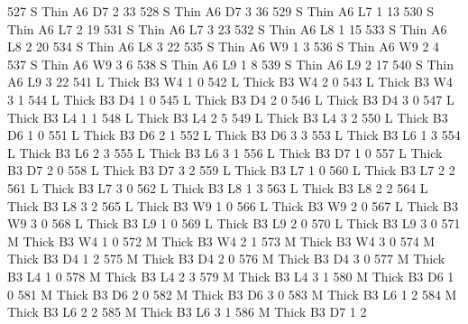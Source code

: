 \documentclass{article}
\begin{document}
\begin{Schunk}
\begin{Soutput}
527       S   Thin   A6      D7     2    33
528       S   Thin   A6      D7     3    36
529       S   Thin   A6      L7     1    13
530       S   Thin   A6      L7     2    19
531       S   Thin   A6      L7     3    23
532       S   Thin   A6      L8     1    15
533       S   Thin   A6      L8     2    20
534       S   Thin   A6      L8     3    22
535       S   Thin   A6      W9     1     3
536       S   Thin   A6      W9     2     4
537       S   Thin   A6      W9     3     6
538       S   Thin   A6      L9     1     8
539       S   Thin   A6      L9     2    17
540       S   Thin   A6      L9     3    22
541       L  Thick   B3      W4     1     0
542       L  Thick   B3      W4     2     0
543       L  Thick   B3      W4     3     1
544       L  Thick   B3      D4     1     0
545       L  Thick   B3      D4     2     0
546       L  Thick   B3      D4     3     0
547       L  Thick   B3      L4     1     1
548       L  Thick   B3      L4     2     5
549       L  Thick   B3      L4     3     2
550       L  Thick   B3      D6     1     0
551       L  Thick   B3      D6     2     1
552       L  Thick   B3      D6     3     3
553       L  Thick   B3      L6     1     3
554       L  Thick   B3      L6     2     3
555       L  Thick   B3      L6     3     1
556       L  Thick   B3      D7     1     0
557       L  Thick   B3      D7     2     0
558       L  Thick   B3      D7     3     2
559       L  Thick   B3      L7     1     0
560       L  Thick   B3      L7     2     2
561       L  Thick   B3      L7     3     0
562       L  Thick   B3      L8     1     3
563       L  Thick   B3      L8     2     2
564       L  Thick   B3      L8     3     2
565       L  Thick   B3      W9     1     0
566       L  Thick   B3      W9     2     0
567       L  Thick   B3      W9     3     0
568       L  Thick   B3      L9     1     0
569       L  Thick   B3      L9     2     0
570       L  Thick   B3      L9     3     0
571       M  Thick   B3      W4     1     0
572       M  Thick   B3      W4     2     1
573       M  Thick   B3      W4     3     0
574       M  Thick   B3      D4     1     2
575       M  Thick   B3      D4     2     0
576       M  Thick   B3      D4     3     0
577       M  Thick   B3      L4     1     0
578       M  Thick   B3      L4     2     3
579       M  Thick   B3      L4     3     1
580       M  Thick   B3      D6     1     0
581       M  Thick   B3      D6     2     0
582       M  Thick   B3      D6     3     0
583       M  Thick   B3      L6     1     2
584       M  Thick   B3      L6     2     2
585       M  Thick   B3      L6     3     1
586       M  Thick   B3      D7     1     2

\end{Soutput}
\end{Schunk}
\end{document}
